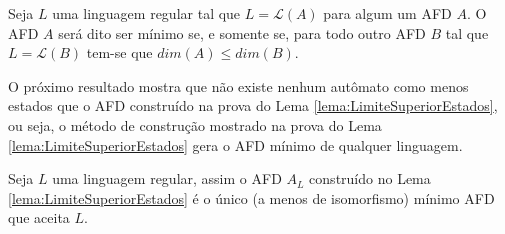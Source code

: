 \begin{definition}
	Seja $L$ uma linguagem regular tal que $L = \mathcal{L}(A)$ para algum um AFD $A$. O AFD $A$ será dito ser mínimo se, e somente se,  para todo outro AFD $B$ tal que $L= \mathcal{L}(B)$ tem-se que $dim(A) \leq dim(B)$. 
\end{definition}

O próximo resultado mostra que não existe nenhum autômato como menos estados que o AFD construído na prova do Lema \ref{lema:LimiteSuperiorEstados}, ou seja, o método de construção mostrado na prova do Lema \ref{lema:LimiteSuperiorEstados} gera o AFD mínimo de qualquer linguagem.

\begin{lemma}\label{lema:UnicadadeMinAFD}
	Seja $L$ uma linguagem regular, assim o  AFD $A_L$ construído no Lema \ref{lema:LimiteSuperiorEstados} é o único (a menos de isomorfismo) mínimo AFD que aceita $L$.
\end{lemma}

